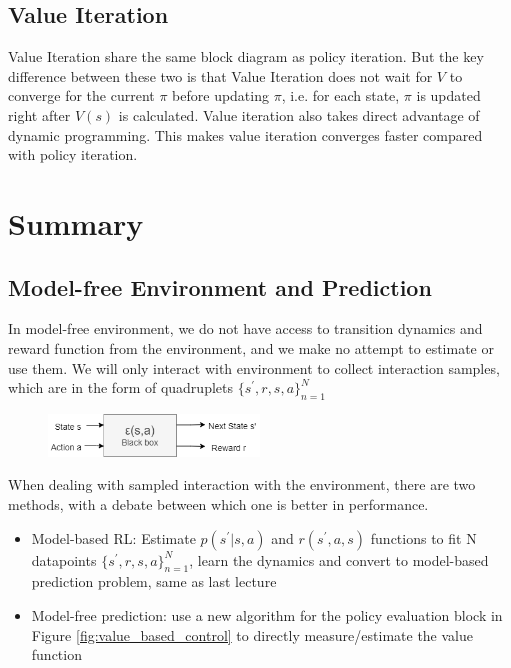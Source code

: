 \documentclass[11pt]{article}
\begin{document}
\subsection{Value Iteration}
Value Iteration share the same block diagram as policy iteration. But the key difference between these two is that Value Iteration does not wait for $V$
to converge for the current $\pi$ before updating $\pi$, i.e. for each state, $\pi$ is updated right after $V(s)$ is calculated. Value iteration also takes direct advantage of dynamic programming. This makes value iteration converges faster compared with policy iteration.

\clearpage
\section{Summary}
\subsection{Model-free Environment and Prediction}
In model-free environment, we do not have access to transition dynamics and reward function from the environment, and we make no attempt to estimate or use them. We will only interact with environment to collect interaction samples, which are in the form of quadruplets $\{s^\prime, r, s, a\}_{n=1}^N$
\begin{figure}[H]
    \centering
    \includegraphics[width=0.5\textwidth]{pic/model_free_environment.png}
\end{figure}

When dealing with sampled interaction with the environment, there are two methods, with a debate between which one is better in performance.
\begin{itemize}
    \item Model-based RL: Estimate $p(s^\prime|s,a)$ and $r(s^\prime, a, s)$ functions to fit N datapoints $\{s^\prime, r, s, a\}_{n=1}^N$, learn the dynamics and convert to model-based prediction problem, same as last lecture
    \item Model-free prediction: use a new algorithm for the policy evaluation block in Figure \ref{fig:value_based_control} to directly measure/estimate the value function
\end{itemize}
\end{document}
